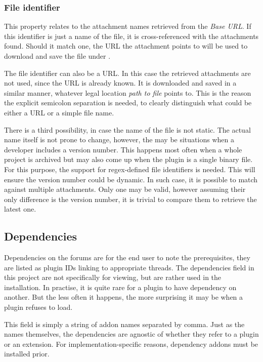 \subsubsection{File identifier}

This property relates to the attachment names retrieved from the \textit{Base URL}.
If this identifier is just a name of the file, it is cross-referenced with the attachments found.
Should it match one, the URL the attachment points to will be used to download and save the file under .

The file identifier can also be a URL.
In this case the retrieved attachments are not used, since the URL is already known.
It is downloaded and saved in a similar manner, whatever legal location \textit{path to file} points to.
This is the reason the explicit semicolon separation is needed, to clearly distinguish what could be either a URL or a simple file name.

There is a third possibility, in case the name of the file is not static.
The actual name itself is not prone to change, however, the may be situations when a developer includes a version number.
This happens most often when a whole project is archived but may also come up when the plugin is a single binary file.
For this purpose, the support for regex-defined file identifiers is needed.
This will ensure the version number could be dynamic.
In such case, it is possible to match against multiple attachments.
Only one may be valid, however assuming their only difference is the version number, it is trivial to compare them to retrieve the latest one.

\subsection{Dependencies}

Dependencies on the forums are for the end user to note the prerequisites, they are listed as plugin IDs linking to appropriate threads.
The dependencies field in this project are not specifically for viewing, but are rather used in the installation.
In practise, it is quite rare for a plugin to have dependency on another.
But the less often it happens, the more surprising it may be when a plugin refuses to load.

This field is simply a string of addon names separated by comma.
Just as the names themselves, the dependencies are agnostic of whether they refer to a plugin or an extension.
For implementation-specific reasons, dependency addons must be installed prior.

